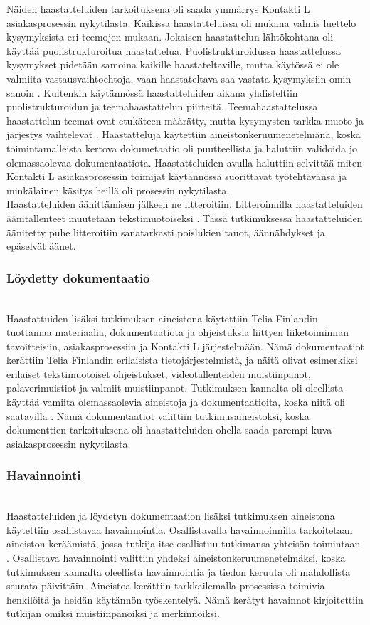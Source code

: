 \documentclass[finnish,12pt,a4paper,pdftex]{article}
\begin{document}
Näiden haastatteluiden tarkoituksena oli saada ymmärrys Kontakti L asiakasprosessin nykytilasta. Kaikissa haastatteluissa oli mukana valmis luettelo kysymyksista eri teemojen mukaan. Jokaisen haastattelun lähtökohtana oli käyttää puolistrukturoitua haastattelua. Puolistrukturoidussa haastattelussa kysymykset pidetään samoina kaikille haastateltaville, mutta käytössä ei ole valmiita vastausvaihtoehtoja, vaan haastateltava saa vastata kysymyksiin omin sanoin \citep{eskola}. Kuitenkin käytännössä haastatteluiden aikana yhdisteltiin puolistrukturoidun ja teemahaastattelun piirteitä. Teemahaastattelussa haastattelun teemat ovat etukäteen määrätty, mutta kysymysten tarkka muoto ja järjestys vaihtelevat \citep{eskola}. Haastatteluja käytettiin aineistonkeruumenetelmänä, koska toimintamalleista kertova dokumetaatio oli puutteellista ja haluttiin validoida jo olemassaolevaa dokumentaatiota. Haastatteluiden avulla haluttiin selvittää miten Kontakti L asiakasprosessin toimijat käytännössä suorittavat työtehtävänsä ja minkälainen käsitys heillä oli prosessin nykytilasta.\\

\noindent Haastatteluiden äänittämisen jälkeen ne litteroitiin. Litteroinnilla haastatteluiden äänitallenteet muutetaan tekstimuotoiseksi \citep{eskola}. Tässä tutkimuksessa haastatteluiden äänitetty puhe litteroitiin sanatarkasti poislukien tauot, äännähdykset ja epäselvät äänet.

\subsubsection{Löydetty dokumentaatio}\\
Haastattuiden lisäksi tutkimuksen aineistona käytettiin Telia Finlandin tuottamaa materiaalia, dokumentaatiota ja ohjeistuksia liittyen liiketoiminnan tavoitteisiin, asiakasprosessiin ja Kontakti L järjestelmään. Nämä dokumentaatiot kerättiin Telia Finlandin erilaisista tietojärjestelmistä, ja näitä olivat esimerkiksi erilaiset tekstimuotoiset ohjeistukset, videotallenteiden muistiinpanot, palaverimuistiot ja valmiit muistiinpanot.  Tutkimuksen kannalta oli oleellista käyttää vamiita olemassaolevia aineistoja ja dokumentaatioita, koska niitä oli saatavilla \citep{eskola}. Nämä dokumentaatiot valittiin tutkimusaineistoksi, koska dokumenttien tarkoituksena oli haastatteluiden ohella saada parempi kuva asiakasprosessin nykytilasta.

\subsubsection{Havainnointi}\\
Haastatteluiden ja löydetyn dokumentaation lisäksi tutkimuksen aineistona käytettiin osallistavaa havainnointia. Osallistavalla havainnoinnilla tarkoitetaan aineiston keräämistä, jossa tutkija itse osallistuu tutkimansa yhteisön toimintaan \citep{eskola}. 
Osallistava havainnointi valittiin yhdeksi aineistonkeruumenetelmäksi, koska tutkimuksen kannalta oleellista havainnointia ja tiedon keruuta oli mahdollista seurata päivittäin. 
Aineistoa kerättiin tarkkailemalla prosessissa toimivia henkilöitä ja heidän käytännön työskentelyä. Nämä kerätyt havainnot kirjoitettiin tutkijan omiksi muistiinpanoiksi ja merkinnöiksi.
\end{document}
